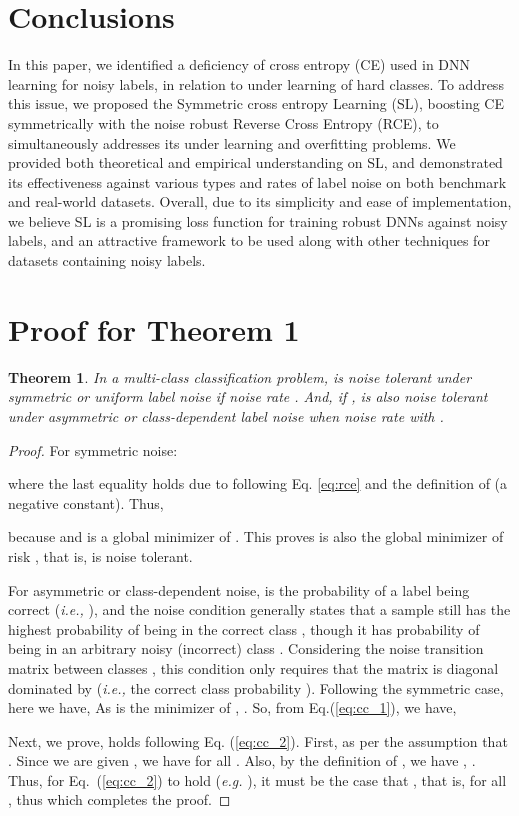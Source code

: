 \documentclass[10pt,twocolumn,letterpaper]{article}
\newtheorem{theorem}{Theorem}
\begin{document}
\section{Conclusions}\label{sec:conclusion}
In this paper, we identified a deficiency of cross entropy (CE) used in DNN learning for noisy labels, in relation to under learning of hard classes. To address this issue, we proposed the Symmetric cross entropy Learning (SL), boosting CE symmetrically with the noise robust Reverse Cross Entropy (RCE), to simultaneously addresses its under learning and overfitting problems. We provided both theoretical and empirical understanding on SL, and demonstrated its effectiveness against various types and rates of label noise on both benchmark and real-world datasets. Overall, due to its simplicity and ease of implementation, we believe SL is a promising loss function for training robust DNNs against noisy labels, and an attractive framework to be used along with other techniques for datasets containing noisy labels.

{
\small


}

\newpage
\onecolumn
\appendix
\setcounter{theorem}{0}

\section{Proof for Theorem 1}\label{appendix_proof}

\begin{theorem}
In a multi-class classification problem,  is noise tolerant under symmetric or uniform label noise if noise rate . And, if ,  is also noise tolerant under asymmetric or class-dependent label noise when noise rate  with .
\end{theorem}
\begin{proof}
For symmetric noise:

where the last equality holds due to  following Eq. \eqref{eq:rce} and the definition of  (a negative constant). Thus, 
	
because  and  is a global minimizer of . This proves  is also the global minimizer of risk , that is,  is noise tolerant. 
	
For asymmetric or class-dependent noise,  is the probability of a label being correct (\textit{i.e.,} ), and the noise condition  generally states that a sample  still has the highest probability of being in the correct class , though it has probability of  being in an arbitrary noisy (incorrect) class . Considering the noise transition matrix between classes , this condition only requires that the matrix is diagonal dominated by  (\textit{i.e.,} the correct class probability ). Following the symmetric case, here we have,
	\small{
		}
	As  is the minimizer of , . So, from Eq.(\ref{eq:cc_1}), we have,
	
	Next, we prove,  holds following Eq. (\ref{eq:cc_2}). First,  as per the assumption that . Since we are given , we have  for all . Also, by the definition of , we have , . Thus, for Eq.~(\ref{eq:cc_2}) to hold (\textit{e.g.} ), it must be the case that , that is,  for all , thus  which completes the proof.
\end{proof}
\end{document}
